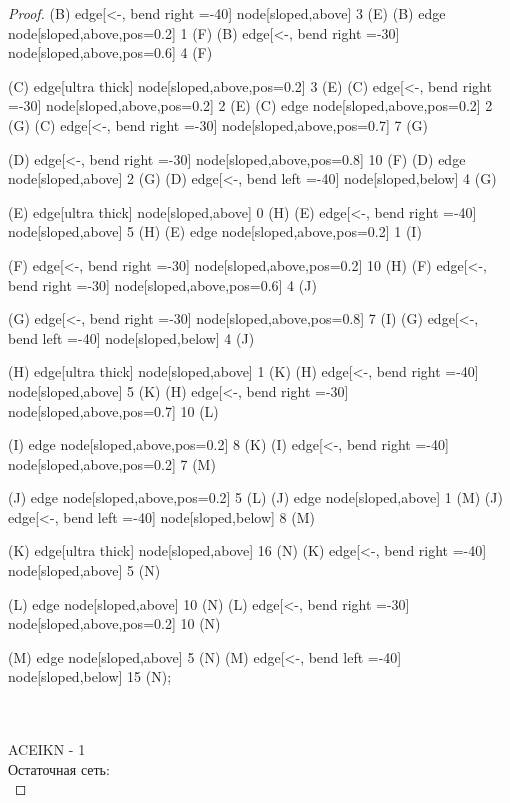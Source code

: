 \begin{proof}
{    (B) edge[<-, bend right =-40] node[sloped,above] {3} (E)
    (B) edge node[sloped,above,pos=0.2] {1} (F)
    (B) edge[<-, bend right =-30] node[sloped,above,pos=0.6] {4} (F)
    
    (C) edge[ultra thick] node[sloped,above,pos=0.2] {3} (E)
    (C) edge[<-, bend right =-30] node[sloped,above,pos=0.2] {2} (E)
    (C) edge node[sloped,above,pos=0.2] {2} (G)
    (C) edge[<-, bend right =-30] node[sloped,above,pos=0.7] {7} (G)

    (D) edge[<-, bend right =-30] node[sloped,above,pos=0.8] {10} (F)
    (D) edge node[sloped,above] {2} (G)
    (D) edge[<-, bend left =-40] node[sloped,below] {4} (G)
    
    (E) edge[ultra thick] node[sloped,above] {0} (H)
    (E) edge[<-, bend right =-40] node[sloped,above] {5} (H)
    (E) edge node[sloped,above,pos=0.2] {1} (I)
    
    (F) edge[<-, bend right =-30] node[sloped,above,pos=0.2] {10} (H)
    (F) edge[<-, bend right =-30] node[sloped,above,pos=0.6] {4} (J)
    
    (G) edge[<-, bend right =-30] node[sloped,above,pos=0.8] {7} (I)
    (G) edge[<-, bend left =-40] node[sloped,below] {4} (J)
    
    (H) edge[ultra thick] node[sloped,above] {1} (K)
    (H) edge[<-, bend right =-40] node[sloped,above] {5} (K)
    (H) edge[<-, bend right =-30] node[sloped,above,pos=0.7] {10} (L)
    
    (I) edge node[sloped,above,pos=0.2] {8} (K)
    (I) edge[<-, bend right =-40] node[sloped,above,pos=0.2] {7} (M)
    
    (J) edge node[sloped,above,pos=0.2] {5} (L)
    (J) edge node[sloped,above] {1} (M)
    (J) edge[<-, bend left =-40] node[sloped,below] {8} (M)
    
    (K) edge[ultra thick] node[sloped,above] {16} (N)
    (K) edge[<-, bend right =-40] node[sloped,above] {5} (N)
    
    (L) edge node[sloped,above] {10} (N)
    (L) edge[<-, bend right =-30] node[sloped,above,pos=0.2] {10} (N)
    
    (M) edge node[sloped,above] {5} (N)
    (M) edge[<-, bend left =-40] node[sloped,below] {15} (N);
    }\\\\
ACEIKN - 1\\
    Остаточная сеть:\\
        \usetikzlibrary{graphs,automata,positioning}
\end{proof}
